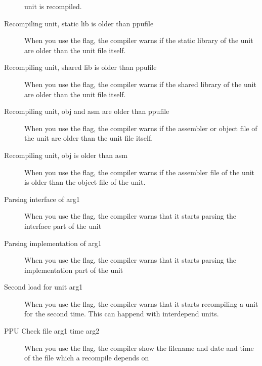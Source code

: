 \begin{description}
 unit is recompiled.
\item [Recompiling unit, static lib is older than ppufile]
 When you use the  flag, the compiler warns if the static library
 of the unit are older than the unit file itself.
\item [Recompiling unit, shared lib is older than ppufile]
 When you use the  flag, the compiler warns if the shared library
 of the unit are older than the unit file itself.
\item [Recompiling unit, obj and asm are older than ppufile]
 When you use the  flag, the compiler warns if the assembler or
 object file of the unit are older than the unit file itself.
\item [Recompiling unit, obj is older than asm]
 When you use the  flag, the compiler warns if the assembler
 file of the unit is older than the object file of the unit.
\item [Parsing interface of arg1]
 When you use the  flag, the compiler warns that it starts
 parsing the interface part of the unit
\item [Parsing implementation of arg1]
 When you use the  flag, the compiler warns that it starts
 parsing the implementation part of the unit
\item [Second load for unit arg1]
 When you use the  flag, the compiler warns that it starts
 recompiling a unit for the second time. This can happend with interdepend
 units.
\item [PPU Check file arg1 time arg2]
 When you use the  flag, the compiler show the filename and
 date and time of the file which a recompile depends on
 \end{description}

